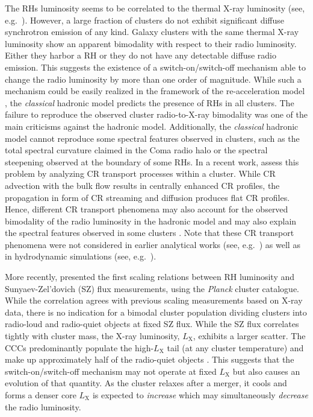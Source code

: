 \documentclass[traditabstract]{aa}
\newcommand{\rmn}{\mathrm}
\begin{document}
The RHs luminosity seems to be correlated to the thermal X-ray luminosity (see,
e.g.~\citealp{2009A&A...507..661B,2011A&A...527A..99E}).  However, a large
fraction of clusters do not exhibit significant diffuse synchrotron emission of
any kind. Galaxy clusters with the same thermal X-ray luminosity show an
apparent bimodality with respect to their radio luminosity. Either they harbor a
RH or they do not have any detectable diffuse radio emission.  This suggests the
existence of a switch-on/switch-off mechanism able to change the radio
luminosity by more than one order of magnitude.  While such a mechanism could be
easily realized in the framework of the re-acceleration model
\citep{2009A&A...507..661B}, the \emph{classical} hadronic model predicts the
presence of RHs in all clusters. The failure to reproduce the observed cluster
radio-to-X-ray bimodality was one of the main criticisms against the hadronic
model. Additionally, the \emph{classical} hadronic model cannot reproduce some
spectral features observed in clusters, such as the total spectral curvature
claimed in the Coma radio halo or the spectral steepening observed at the
boundary of some RHs. In a recent work, \cite{2011A&A...527A..99E} assess this
problem by analyzing CR transport processes within a cluster. While CR advection
with the bulk flow results in centrally enhanced CR profiles, the propagation in
form of CR streaming and diffusion produces flat CR profiles. Hence, different
CR transport phenomena may also account for the observed bimodality of the radio
luminosity in the hadronic model and may also explain the spectral features
observed in some clusters \citep{2011A&A...527A..99E}. Note that these CR
transport phenomena were not considered in earlier analytical works (see,
e.g.~\citealp{2004A&A...413...17P}) as well as in hydrodynamic simulations (see,
e.g.~\citealp{2001ApJ...562..233M, 2008MNRAS.385.1211P, 2010MNRAS.409..449P}).

More recently, \cite{2012MNRAS.421L.112B} presented the first scaling relations
between RH luminosity and Sunyaev-Zel'dovich (SZ) flux measurements, using the
\emph{Planck} cluster catalogue. While the correlation agrees with previous
scaling measurements based on X-ray data, there is no indication for a bimodal
cluster population dividing clusters into radio-loud and radio-quiet objects at
fixed SZ flux. While the SZ flux correlates tightly with cluster mass, the X-ray
luminosity, $L_\rmn{X}$, exhibits a larger scatter. The CCCs predominantly
populate the high-$L_\rmn{X}$ tail (at any cluster temperature) and make up
approximately half of the radio-quiet objects \citep{2011A&A...527A..99E}. This
suggests that the switch-on/switch-off mechanism may not operate at fixed
$L_\rmn{X}$ but also causes an evolution of that quantity. As the cluster
relaxes after a merger, it cools and forms a denser core $L_\rmn{X}$ is expected
to {\em increase} which may simultaneously {\em decrease} the radio luminosity.
 
\end{document}
